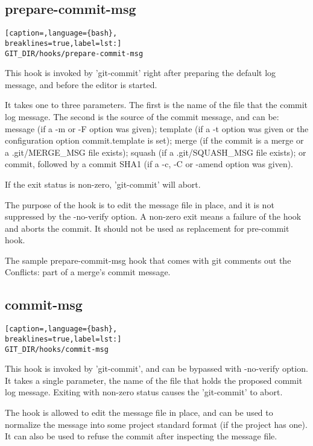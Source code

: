 \subsection{prepare-commit-msg}
\lstset{basicstyle=\scriptsize, numbers=none, captionpos=b, tabsize=4}
\begin{lstlisting}[caption=,language={bash},
breaklines=true,label=lst:]
GIT_DIR/hooks/prepare-commit-msg
\end{lstlisting}

This hook is invoked by 'git-commit' right after preparing the default log
message, and before the editor is started.

It takes one to three parameters. The first is the name of the file that the
commit log message. The second is the source of the commit message, and can be:
message (if a -m or -F option was given); template (if a -t option was given or
the configuration option commit.template is set); merge (if the commit is a
merge or a .git/MERGE\_MSG file exists); squash (if a .git/SQUASH\_MSG file
exists); or commit, followed by a commit SHA1 (if a -c, -C or \--amend option
was given).

If the exit status is non-zero, 'git-commit' will abort.

The purpose of the hook is to edit the message file in place, and it is not
suppressed by the \--no-verify option. A non-zero exit means a failure of the
hook and aborts the commit. It should not be used as replacement for pre-commit
hook.

The sample prepare-commit-msg hook that comes with git comments out the
Conflicts: part of a merge's commit message.

\subsection{commit-msg}
\lstset{basicstyle=\scriptsize, numbers=none, captionpos=b, tabsize=4}
\begin{lstlisting}[caption=,language={bash},
breaklines=true,label=lst:]
GIT_DIR/hooks/commit-msg
\end{lstlisting}

This hook is invoked by 'git-commit', and can be bypassed with \--no-verify
option. It takes a single parameter, the name of the file that holds the
proposed commit log message. Exiting with non-zero status causes the
'git-commit' to abort.

The hook is allowed to edit the message file in place, and can be used to
normalize the message into some project standard format (if the project has
one). It can also be used to refuse the commit after inspecting the message
file.


